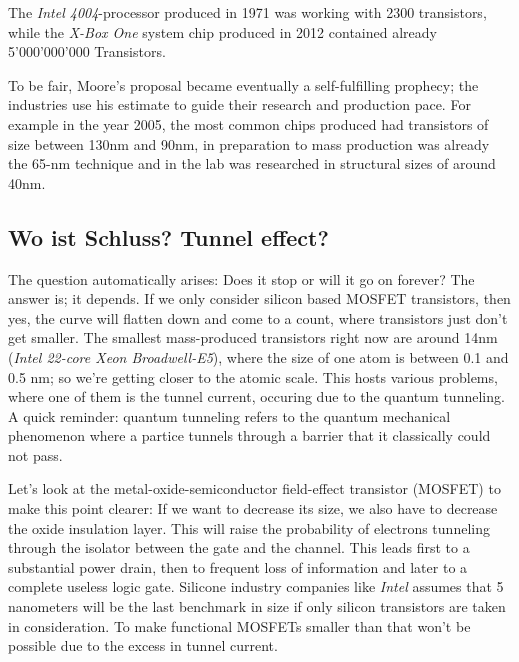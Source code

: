 \documentclass[11pt]{article}
\begin{document}
The \textit{Intel 4004}-processor produced in 1971 was working with 2300 transistors, while the \textit{X-Box One} system chip produced in 2012 contained already 5'000'000'000 Transistors.

To be fair, Moore's proposal became eventually a self-fulfilling prophecy; the industries use his estimate to guide their research and production pace. For example in the year 2005, the most common chips produced had transistors of size between 130nm and 90nm, in preparation to mass production was already the 65-nm technique and in the lab was researched in structural sizes of around 40nm.
\subsection{Wo ist Schluss? Tunnel effect?}
The question automatically arises: Does it stop or will it go on forever? The answer is; it depends. If we only consider silicon based MOSFET transistors, then yes, the curve will flatten down and come to a count, where transistors just don't get smaller. The smallest mass-produced transistors right now are around 14nm (\textit{Intel 22-core Xeon Broadwell-E5}), where the size of one atom is between 0.1 and 0.5 nm; so we're getting closer to the atomic scale. This hosts various problems, where one of them is the tunnel current, occuring due to the quantum tunneling. A quick reminder: quantum tunneling refers to the quantum mechanical phenomenon where a partice tunnels through a barrier that it classically could not pass. 


Let's look at the metal-oxide-semiconductor field-effect transistor (MOSFET) to make this point clearer: If we want to decrease its size, we also have to decrease the oxide insulation layer. This will raise the probability of electrons tunneling through the isolator between the gate and the channel. This leads first to a substantial power drain, then to frequent loss of information and later to a complete useless logic gate. Silicone industry companies like \textit{Intel} assumes that 5 nanometers will be the last benchmark in size if only silicon transistors are taken in consideration. To make functional MOSFETs smaller than that won't be possible due to the excess in tunnel current. 
\end{document}
